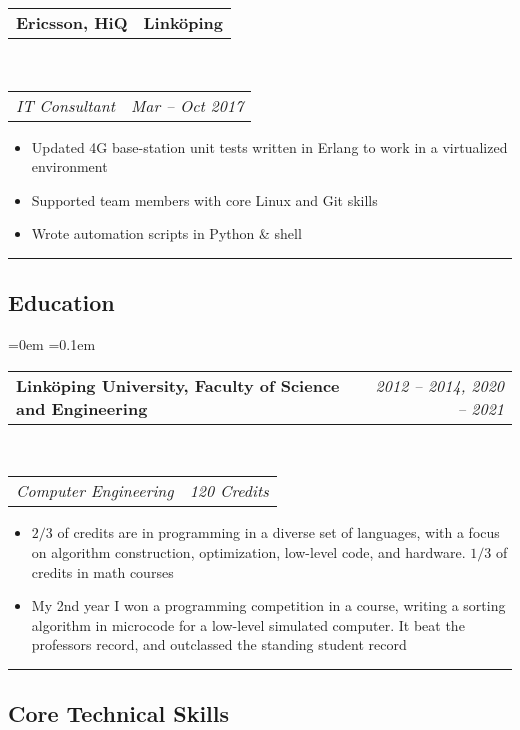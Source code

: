 \documentclass[10pt,letterpaper]{article}
\makeatletter
\newcommand{\headerrow}[2]
{\begin{tabular*}{\linewidth}{l@{\extracolsep{\fill}}r}
	#1 &
	#2 \\
\end{tabular*}}
\makeatother
\begin{document}
\headerrow
{\textbf{Ericsson, HiQ}}
{\textbf{Linköping}}
\\
\headerrow
{\emph{IT Consultant}}
{\emph{Mar -- Oct 2017}}
\begin{itemize}[noitemsep, topsep=0pt]
    \item Updated 4G base-station unit tests written in
        Erlang to work in a virtualized environment
    \item Supported team members with core Linux and Git skills
    \item Wrote automation scripts in Python \& shell
\end{itemize}
\vspace{0.5em}



\hrule
\vspace{-0.4em}
\subsection*{Education}
\parindent=0em
\parskip=0.1em

\headerrow
    {\textbf{Linköping University, Faculty of Science and Engineering}}
    {\emph{2012 -- 2014, 2020 -- 2021}}
\\
\headerrow
    {\emph{Computer Engineering}}
    {\emph{120 Credits}}
\begin{itemize}[noitemsep, topsep=0pt]
    \item \( 2/3 \) of credits are in programming in a diverse set of
        languages, with a focus on algorithm construction, optimization,
        low-level code, and hardware. \( 1/3 \) of credits in math courses
    \item My 2nd year I won a programming competition in a course,
        writing a sorting algorithm in microcode for
        a low-level simulated computer. It beat the
        professors record, and outclassed the standing student record
\end{itemize}
\vspace{0.5em}



\hrule
\vspace{-0.4em}
\subsection*{Core Technical Skills}
\end{document}
